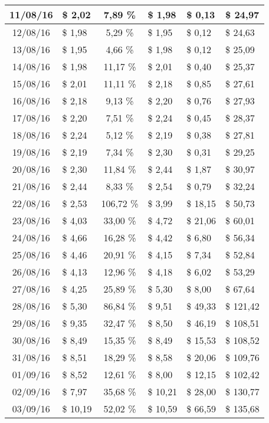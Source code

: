 \begin{center}
\begin{small}
\begin{longtable}{|c|l|c|l|l|l|}
11/08/16 & \$ 2,02 & 7,89 \% & \$ 1,98 & \$ 0,13 & \$ 24,97 \\ \hline
12/08/16 & \$ 1,98 & 5,29 \% & \$ 1,95 & \$ 0,12 & \$ 24,63 \\ \hline
13/08/16 & \$ 1,95 & 4,66 \% & \$ 1,98 & \$ 0,12 & \$ 25,09 \\ \hline
14/08/16 & \$ 1,98 & 11,17 \% & \$ 2,01 & \$ 0,40 & \$ 25,37 \\ \hline
15/08/16 & \$ 2,01 & 11,11 \% & \$ 2,18 & \$ 0,85 & \$ 27,61 \\ \hline
16/08/16 & \$ 2,18 & 9,13 \% & \$ 2,20 & \$ 0,76 & \$ 27,93 \\ \hline
17/08/16 & \$ 2,20 & 7,51 \% & \$ 2,24 & \$ 0,45 & \$ 28,37 \\ \hline
18/08/16 & \$ 2,24 & 5,12 \% & \$ 2,19 & \$ 0,38 & \$ 27,81 \\ \hline
19/08/16 & \$ 2,19 & 7,34 \% & \$ 2,30 & \$ 0,31 & \$ 29,25 \\ \hline
20/08/16 & \$ 2,30 & 11,84 \% & \$ 2,44 & \$ 1,87 & \$ 30,97 \\ \hline
21/08/16 & \$ 2,44 & 8,33 \% & \$ 2,54 & \$ 0,79 & \$ 32,24 \\ \hline
22/08/16 & \$ 2,53 & 106,72 \% & \$ 3,99 & \$ 18,15 & \$ 50,73 \\ \hline
23/08/16 & \$ 4,03 & 33,00 \% & \$ 4,72 & \$ 21,06 & \$ 60,01 \\ \hline
24/08/16 & \$ 4,66 & 16,28 \% & \$ 4,42 & \$ 6,80 & \$ 56,34 \\ \hline
25/08/16 & \$ 4,46 & 20,91 \% & \$ 4,15 & \$ 7,34 & \$ 52,84 \\ \hline
26/08/16 & \$ 4,13 & 12,96 \% & \$ 4,18 & \$ 6,02 & \$ 53,29 \\ \hline
27/08/16 & \$ 4,25 & 25,89 \% & \$ 5,30 & \$ 8,00 & \$ 67,64 \\ \hline
28/08/16 & \$ 5,30 & 86,84 \% & \$ 9,51 & \$ 49,33 & \$ 121,42 \\ \hline
29/08/16 & \$ 9,35 & 32,47 \% & \$ 8,50 & \$ 46,19 & \$ 108,51 \\ \hline
30/08/16 & \$ 8,49 & 15,35 \% & \$ 8,49 & \$ 15,53 & \$ 108,52 \\ \hline
31/08/16 & \$ 8,51 & 18,29 \% & \$ 8,58 & \$ 20,06 & \$ 109,76 \\ \hline
01/09/16 & \$ 8,52 & 12,61 \% & \$ 8,00 & \$ 12,15 & \$ 102,42 \\ \hline
02/09/16 & \$ 7,97 & 35,68 \% & \$ 10,21 & \$ 28,00 & \$ 130,77 \\ \hline
03/09/16 & \$ 10,19 & 52,02 \% & \$ 10,59 & \$ 66,59 & \$ 135,68 \\ \hline

\end{longtable}
\end{small}
\end{center}
